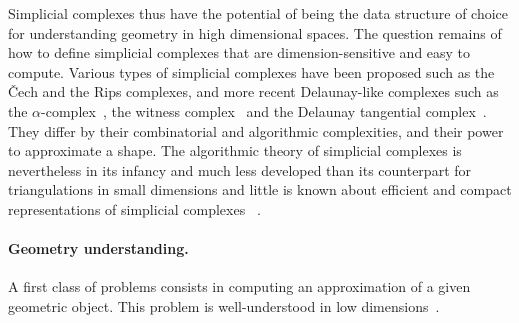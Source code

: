 

Simplicial complexes thus have the potential of being the data structure of choice for understanding geometry in high dimensional spaces. The question remains of how to define simplicial complexes that are dimension-sensitive and easy to compute.  Various types of simplicial complexes have been proposed such as the \v{C}ech and the Rips complexes, and more recent Delaunay-like complexes such as the $\alpha$-complex~\cite{eks-sspp-83,he-ubds-95}, the witness complex~\cite{deSilva2008,cds-tewc-2004} and the Delaunay tangential complex~\cite{geometrica-7142i}. They differ by their combinatorial and algorithmic complexities, and their power to approximate a shape.  The algorithmic theory of simplicial complexes is nevertheless in its infancy and much less developed than its counterpart for triangulations in small dimensions%
and little is known about efficient and compact representations of simplicial complexes%
~\cite{Attali2011}.  


\paragraph{Geometry understanding.}

A first class of problems consists in computing an approximation of a given geometric object. 
This problem is  well-understood in low dimensions~\cite{he-gtmg-2001,geometrica-bcmrv-ms-06}. 
 
